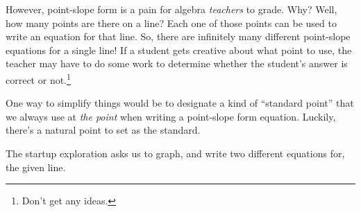 However, point-slope form is a pain for algebra \textit{teachers} to grade. Why? Well, how many points are there on a line? Each one of those points can be used to write an equation for that line. So, there are infinitely many different point-slope equations for a single line! If a student gets creative about what point to use, the teacher may have to do some work to determine whether the student's answer is correct or not.\footnote{Don't get any ideas.}

One way to simplify things would be to designate a kind of ``standard point'' that we always use at \textit{the point} when writing a point-slope form equation. Luckily, there's a natural point to set as the standard.

The startup exploration asks us to graph, and write two different equations for, the given line.

\begin{center}
\end{center}
%


